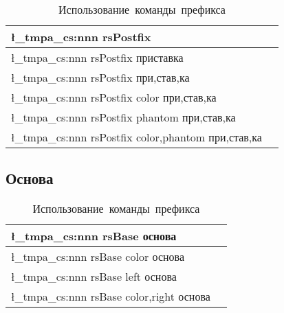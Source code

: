 \renewcommand{\arraystretch}{1.125}
\begin{table}[ht!]
    \centering
    \begin{tabular}{@{}ll@{}}
        \toprule
        \l_tmpa_cs:nnn { rsPostfix } {} { }                          \\ \midrule
        \l_tmpa_cs:nnn { rsPostfix } {} { приставка }                \\ \midrule
        \l_tmpa_cs:nnn { rsPostfix } {} { при,став,ка }              \\ \midrule
        \l_tmpa_cs:nnn { rsPostfix } {color} { при,став,ка }         \\ \midrule
        \l_tmpa_cs:nnn { rsPostfix } {phantom} { при,став,ка }       \\ \midrule
        \l_tmpa_cs:nnn { rsPostfix } {color,phantom} { при,став,ка } \\ \midrule
        \bottomrule
    \end{tabular}
    \caption{Использование~команды~префикса}
\end{table}

\ExplSyntaxOff



\subsection{Основа}

\ExplSyntaxOn

\begin{tcolorbox}
\end{tcolorbox}

\renewcommand{\arraystretch}{1.125}
\begin{table}[ht!]
    \centering
    \begin{tabular}{@{}ll@{}}
        \toprule
        \l_tmpa_cs:nnn { rsBase } {} { основа }            \\ \midrule
        \l_tmpa_cs:nnn { rsBase } {color} { основа }       \\ \midrule
        \l_tmpa_cs:nnn { rsBase } {left} { основа }        \\ \midrule
        \l_tmpa_cs:nnn { rsBase } {color,right} { основа } \\ \midrule
        \bottomrule
    \end{tabular}
    \caption{Использование~команды~префикса}
\end{table}

